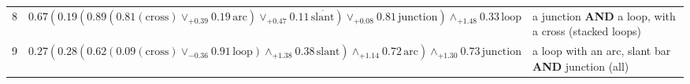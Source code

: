 \begin{table}[t]
\begin{center}
\begin{tabular}{c l l}
8 & $0.67(0.19(0.89(0.81(\text{cross})\vee_{+0.39}0.19\,\text{arc})\vee_{+0.47}0.11\,\overline{\text{slant}})\vee_{+0.08}0.81\,\text{junction})\wedge_{+1.48}0.33\,\text{loop}$ & a junction \textbf{AND} a loop, with a cross (stacked loops) \\[3pt]
9 & $0.27(0.28(0.62(0.09(\text{cross})\vee_{-0.36}0.91\,\text{loop})\wedge_{+1.38}0.38\,\text{slant})\wedge_{+1.14}0.72\,\text{arc})\wedge_{+1.30}0.73\,\text{junction}$ & a loop with an arc, slant bar \textbf{AND} junction (all) \\[3pt]
\end{tabular}
\end{center}
\end{table}